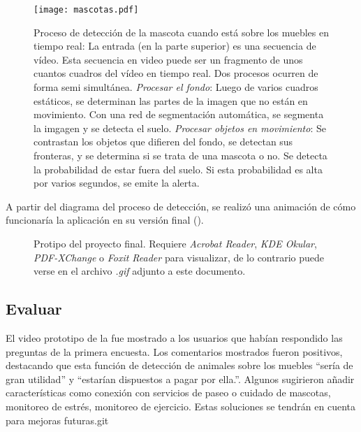 \documentclass[12pt,a4paper]{proyectoinnovacion}
\begin{document}
\begin{figure}
  \centering
  \caption[Proceso de identificación ]{Proceso de detección de la mascota cuando está sobre los muebles en tiempo real:  La entrada (en la parte superior) es una secuencia de vídeo. Esta secuencia en video puede ser un fragmento de unos cuantos cuadros del vídeo en tiempo real.  Dos procesos ocurren de forma semi simultánea. \textit{Procesar el fondo}: Luego de varios cuadros estáticos, se determinan las partes de la imagen que no están en movimiento. Con una red de segmentación automática, se segmenta la imgagen y se detecta el suelo. \textit{Procesar objetos en movimiento}: Se contrastan los objetos que difieren del fondo, se detectan sus fronteras, y se determina si se trata de una mascota o no. Se detecta la probabilidad de estar fuera del suelo. Si esta probabilidad es alta por varios segundos, se emite la alerta.}
  \label{fig:mascotas}
  \texttt{[image: mascotas.pdf]}
\end{figure}


A partir del diagrama del proceso de detección, se realizó una animación de cómo funcionaría la aplicación en su versión final ().

\begin{figure}
  \centering
  \caption[Prototipo del proyecto final.]{Protipo del proyecto final. Requiere \textit{Acrobat Reader}, \textit{KDE Okular}, \textit{PDF-XChange} o \textit{Foxit Reader} para  visualizar, de lo contrario puede verse en el archivo \textit{.gif} adjunto a este documento.}
  \label{fig:animacion}
\end{figure}


\subsection{Evaluar}

El video prototipo de la  fue mostrado a los usuarios que habían respondido las preguntas de la primera encuesta. Los comentarios mostrados fueron positivos, destacando que esta función de detección de animales sobre los muebles ``sería de gran utilidad'' y ``estarían dispuestos a pagar por ella.''. Algunos sugirieron añadir características como conexión con servicios de paseo o cuidado de mascotas, monitoreo de estrés, monitoreo de ejercicio. Estas soluciones se tendrán en cuenta para mejoras futuras.git
\end{document}
